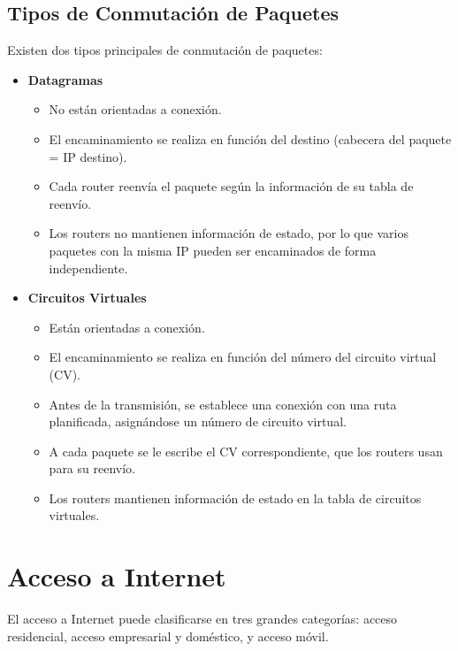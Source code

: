 \documentclass{article}
\begin{document}
\newpage

\subsection{Tipos de Conmutación de Paquetes}
Existen dos tipos principales de conmutación de paquetes:
\begin{itemize}
    \item \textbf{Datagramas}
    \begin{itemize}
        \item No están orientadas a conexión.
        \item El encaminamiento se realiza en función del destino (cabecera del paquete = IP destino).
        \item Cada router reenvía el paquete según la información de su tabla de reenvío.
        \item Los routers no mantienen información de estado, por lo que varios paquetes con la misma IP pueden ser encaminados de forma independiente.
    \end{itemize}
    \item \textbf{Circuitos Virtuales}
    \begin{itemize}
        \item Están orientadas a conexión.
        \item El encaminamiento se realiza en función del número del circuito virtual (CV).
        \item Antes de la transmisión, se establece una conexión con una ruta planificada, asignándose un número de circuito virtual.
        \item A cada paquete se le escribe el CV correspondiente, que los routers usan para su reenvío.
        \item Los routers mantienen información de estado en la tabla de circuitos virtuales.
    \end{itemize}
\end{itemize}

\newpage

\section{Acceso a Internet}

El acceso a Internet puede clasificarse en tres grandes categorías: acceso residencial, acceso empresarial y doméstico, y acceso móvil.
\end{document}
